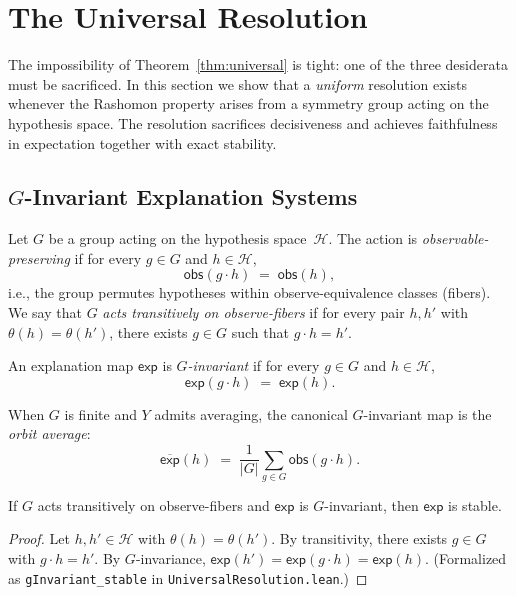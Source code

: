 \documentclass[twoside]{jmlr}
\newcommand{\sH}{\mathcal{H}}
\begin{document}
\section{The Universal Resolution}
\label{sec:resolution}

The impossibility of Theorem~\ref{thm:universal} is tight: one of the three
desiderata must be sacrificed.  In this section we show that a \emph{uniform}
resolution exists whenever the Rashomon property arises from a symmetry group
acting on the hypothesis space.  The resolution sacrifices decisiveness and
achieves faithfulness in expectation together with exact stability.

\subsection{$G$-Invariant Explanation Systems}
\label{sec:g-invariant}

Let $G$ be a group acting on the hypothesis space~$\sH$.  The action is
\emph{observable-preserving} if for every $g \in G$ and $h \in \sH$,
\[
  \mathsf{obs}(g \cdot h) \;=\; \mathsf{obs}(h),
\]
i.e., the group permutes hypotheses within observe-equivalence classes
(fibers).  We say that $G$ \emph{acts transitively on observe-fibers} if for
every pair $h, h'$ with $\theta(h) = \theta(h')$, there exists $g \in G$
such that $g \cdot h = h'$.

\begin{definition}
\label{def:g-invariant}
An explanation map $\mathsf{exp}$ is \emph{$G$-invariant} if for every
$g \in G$ and $h \in \sH$,
\[
  \mathsf{exp}(g \cdot h) \;=\; \mathsf{exp}(h).
\]
\end{definition}

When $G$ is finite and $Y$ admits averaging, the canonical $G$-invariant map
is the \emph{orbit average}:
\[
  \overline{\mathsf{exp}}(h) \;=\; \frac{1}{|G|}\sum_{g \in G} \mathsf{obs}(g \cdot h).
\]

\begin{proposition}
\label{prop:g-invariant-stable}
If $G$ acts transitively on observe-fibers and $\mathsf{exp}$ is
$G$-invariant, then $\mathsf{exp}$ is stable.
\end{proposition}

\begin{proof}
Let $h, h' \in \sH$ with $\theta(h) = \theta(h')$.  By transitivity, there
exists $g \in G$ with $g \cdot h = h'$.  By $G$-invariance,
$\mathsf{exp}(h') = \mathsf{exp}(g \cdot h) = \mathsf{exp}(h)$.
(Formalized as \texttt{gInvariant\_stable} in
\texttt{UniversalResolution.lean}.)
\end{proof}
\end{document}
